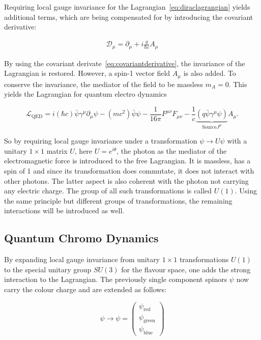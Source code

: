 Requiring local gauge invariance for the Lagrangian~\eqref{eq:diraclagrangian} yields additional terms, which are being compensated for by introducing the covariant derivative:

\begin{align}
  \label{eq:covariantderivative}
  \mathcal{D}_\mu = \partial_\mu + i \frac{q}{\hbar c} A_\mu
\end{align}

\noindent By using the covariant derivate~\eqref{eq:covariantderivative}, the invariance of the Lagrangian is restored. However, a spin-1 vector field $A_\mu$ is also added. To conserve the invariance, the mediator of the field to be massless $m_A = 0$. \noindent This yields the Lagrangian for quantum electro dynamics

\begin{equation}
  \label{eq:qedlagrangian}
  \mathcal{L}_{\text{QED}} = i (\hbar c) \bar{\psi} \gamma^\mu \partial_\mu \psi - (m c^2) \bar{\psi} \psi - \frac{1}{16 \pi} F^{\mu \nu} F_{\mu \nu} - \frac{1}{c} \underbrace{(q \bar{\psi} \gamma^\mu  \psi)}_{\text{Source} J^\mu} A_\mu.
\end{equation}

So by requiring local gauge invariance under a transformation $\psi \rightarrow U \psi$ with a unitary $1 \times 1$ matrix $U$, here $U = e^{i \theta}$, the photon as the mediator of the electromagnetic force is introduced to the free Lagrangian. It is massless, has a spin of 1 and since its transformation does commutate, it does not interact with other photons. The latter aspect is also coherent with the photon not carrying any electric charge. The group of all such transformations is called $U(1)$. Using the same principle but different groups of transformations, the remaining interactions will be introduced as well.

\subsection{Quantum Chromo Dynamics}
\label{sec:qcd}

By expanding local gauge invariance from unitary $1 \times 1$ transformations $U(1)$ to the special unitary group $SU(3)$ for the flavour space, one adds the strong interaction to the Lagrangian. The previously single component spinors $\psi$ now carry the colour charge and are extended as follows:

\begin{equation}
  \label{eq:colorspinor}
  \psi \rightarrow \psi = \begin{pmatrix}
    \psi_{\text{red}} \\
    \psi_{\text{green}} \\
    \psi_{\text{blue}}
  \end{pmatrix}
\end{equation}

